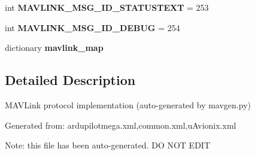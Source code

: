 \begin{DoxyCompactItemize}
int {\bfseries M\+A\+V\+L\+I\+N\+K\+\_\+\+M\+S\+G\+\_\+\+I\+D\+\_\+\+S\+T\+A\+T\+U\+S\+T\+E\+XT} = 253
\item 
\mbox{\label{namespacepymavlink_1_1dialects_1_1v10_aa3add84153d7037930189ab7d94668f4}} 
int {\bfseries M\+A\+V\+L\+I\+N\+K\+\_\+\+M\+S\+G\+\_\+\+I\+D\+\_\+\+D\+E\+B\+UG} = 254
\item 
\mbox{\label{namespacepymavlink_1_1dialects_1_1v10_a5d466050e75cca4e2013e0194e34644d}} 
dictionary {\bfseries mavlink\+\_\+map}
\end{DoxyCompactItemize}


\subsection{Detailed Description}
\begin{DoxyVerb}MAVLink protocol implementation (auto-generated by mavgen.py)

Generated from: ardupilotmega.xml,common.xml,uAvionix.xml

Note: this file has been auto-generated. DO NOT EDIT
\end{DoxyVerb}
 